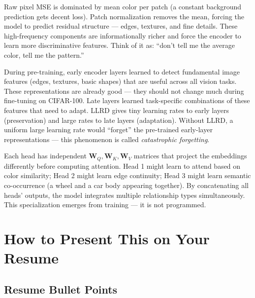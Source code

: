 \documentclass[12pt, a4paper]{report}
\newcommand{\mat}[1]{\mathbf{#1}}
\begin{document}
\begin{interviewbox}
Raw pixel MSE is dominated by mean color per patch (a constant background prediction gets decent loss). Patch normalization removes the mean, forcing the model to predict residual structure — edges, textures, and fine details. These high-frequency components are informationally richer and force the encoder to learn more discriminative features. Think of it as: ``don't tell me the average color, tell me the pattern.''
\end{interviewbox}

\begin{interviewbox}
During pre-training, early encoder layers learned to detect fundamental image features (edges, textures, basic shapes) that are useful across all vision tasks. These representations are already good — they should not change much during fine-tuning on CIFAR-100. Late layers learned task-specific combinations of these features that need to adapt. LLRD gives tiny learning rates to early layers (preservation) and large rates to late layers (adaptation). Without LLRD, a uniform large learning rate would ``forget'' the pre-trained early-layer representations — this phenomenon is called \emph{catastrophic forgetting}.
\end{interviewbox}

\begin{interviewbox}
Each head has independent $\mat{W}_Q, \mat{W}_K, \mat{W}_V$ matrices that project the embeddings differently before computing attention. Head 1 might learn to attend based on color similarity; Head 2 might learn edge continuity; Head 3 might learn semantic co-occurrence (a wheel and a car body appearing together). By concatenating all heads' outputs, the model integrates multiple relationship types simultaneously. This specialization emerges from training — it is not programmed.
\end{interviewbox}

\chapter{How to Present This on Your Resume}

\section{Resume Bullet Points}
\end{document}
